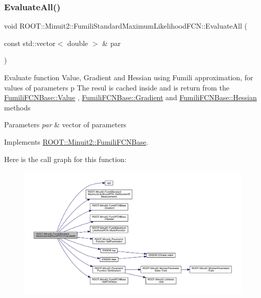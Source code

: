 \subsubsection{\texorpdfstring{EvaluateAll()}{EvaluateAll()}\hspace{0.1cm}{\footnotesize\ttfamily [2/2]}}
{\footnotesize\ttfamily void R\+O\+O\+T\+::\+Minuit2\+::\+Fumili\+Standard\+Maximum\+Likelihood\+F\+C\+N\+::\+Evaluate\+All (\begin{DoxyParamCaption}\item[{const std\+::vector$<$ double $>$ \&}]{par }\end{DoxyParamCaption})\hspace{0.3cm}{\ttfamily [virtual]}}

Evaluate function Value, Gradient and Hessian using Fumili approximation, for values of parameters p The resul is cached inside and is return from the \mbox{\hyperlink{classROOT_1_1Minuit2_1_1FumiliFCNBase_a221dacee0ccde747a271a0cecd759f98}{Fumili\+F\+C\+N\+Base\+::\+Value}} , \mbox{\hyperlink{classROOT_1_1Minuit2_1_1FumiliFCNBase_ad226939ea2e83f754b5a6afc30876d3e}{Fumili\+F\+C\+N\+Base\+::\+Gradient}} and \mbox{\hyperlink{classROOT_1_1Minuit2_1_1FumiliFCNBase_ade134d8c6613393e942ef98d445db376}{Fumili\+F\+C\+N\+Base\+::\+Hessian}} methods


\begin{DoxyParams}{Parameters}
{\em par} & vector of parameters \\
\hline
\end{DoxyParams}


Implements \mbox{\hyperlink{classROOT_1_1Minuit2_1_1FumiliFCNBase_a0741bb4a7405cc33ab60583472a189cb}{R\+O\+O\+T\+::\+Minuit2\+::\+Fumili\+F\+C\+N\+Base}}.

Here is the call graph for this function\+:\nopagebreak
\begin{figure}[H]
\begin{center}
\leavevmode
\includegraphics[width=350pt]{dd/d40/classROOT_1_1Minuit2_1_1FumiliStandardMaximumLikelihoodFCN_a1faea776f7da3c238e522748b573caab_cgraph}
\end{center}
\end{figure}
\mbox{\label{classROOT_1_1Minuit2_1_1FumiliStandardMaximumLikelihoodFCN_a6eb1fbf9c0c13057e080f8ed7af7a1c2}} 
